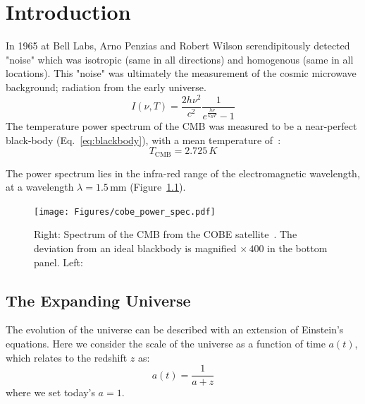 
\chapter{Introduction} %

\label{ch:intro} %


\newcommand{\keyword}[1]{\textbf{#1}}
\newcommand{\tabhead}[1]{\textbf{#1}}
\newcommand{\code}[1]{\texttt{#1}}
\newcommand{\file}[1]{\texttt{\bfseries#1}}
\newcommand{\option}[1]{\texttt{\itshape#1}}
\newcommand{\enquote}[1]{``#1"}

In 1965 at Bell Labs, Arno Penzias and Robert Wilson serendipitously detected "noise" which was isotropic (same in all directions) and homogenous (same in all locations).  This "noise" was ultimately the measurement of the cosmic microwave background; radiation from the early universe.
\begin{equation}
    I(\nu,T) = \frac{2h\nu^2}{c^2}\frac{1}{e^{\frac{h\nu}{k_B T}} -1}
    \label{eq:blackbody}
\end{equation}
The temperature power spectrum of the CMB was measured to be a near-perfect black-body (Eq.~\ref{eq:blackbody}), with a mean temperature of~\cite{burke_graham-smith_wilkinson_2019}:
\begin{equation}
    T_{\text{CMB}} = 2.725\,K
\end{equation}

The power spectrum lies in the infra-red range of the electromagnetic wavelength, at a wavelength $\lambda = 1.5\,\text{mm}$ (Figure~\ref{fig:cobe_power_spectra}).

\begin{figure}[t]
    \centering
    \texttt{[image: Figures/cobe\_power\_spec.pdf]}
    \caption{Right: Spectrum of the CMB from the COBE satellite~\cite{1994ApJ...420..439M}.  The deviation from an ideal blackbody is magnified $\times\,400$ in the bottom panel.  Left: ~\cite{1992ApJ...396L...1S}}
    \label{fig:cobe_power_spectra}
\end{figure}

\section{The Expanding Universe}
The evolution of the universe can be described with an extension of Einstein's equations.  Here we consider the scale of the universe as a function of time $a(t)$, which relates to the redshift $z$ as:
\begin{equation}
    a(t) = \frac{1}{a+z}
\end{equation}
where we set today's $a=1$.  

